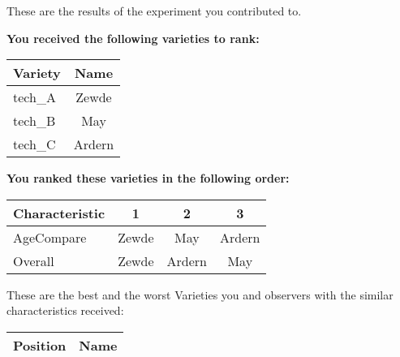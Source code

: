 \documentclass[10pt]{article}
\begin{document}
\begin{titlepage}
	These are the results of the experiment you contributed to.

	\begin{flushleft}
		\textbf{You received the following varieties to rank: }\hfill \break
		\begin{tabularx}{\textwidth}{ X | c  }
			\hline
			\textbf{Variety} & \textbf{Name} \\ \hline

			
				tech\_A & Zewde \\ \hline
			
				tech\_B & May \\ \hline
			
				tech\_C & Ardern \\ \hline
			


		\end{tabularx}\newline \newline

		\textbf{You ranked these varieties in the following order: }\hfill \break
		\begin{tabularx}{\textwidth}{ X | c | c | c  }
			\hline
			\textbf{Characteristic}
			
				& \textbf{ 1 }
			
				& \textbf{ 2 }
			
				& \textbf{ 3 }
			
			\\ \hline


			
				AgeCompare & Zewde  & May  & Ardern  \\ \hline


			
				Overall & Zewde  & Ardern  & May  \\ \hline


			

		\end{tabularx}

	\end{flushleft}

	\pagebreak

	\begin{flushleft}
		These are the best and the worst Varieties you and observers with the similar characteristics received:\hfill \break \newline
		\begin{tabularx}{\textwidth}{ X | X  }
			\hline
			\textbf{Position} & \textbf{Name} \\ \hline


\end{tabularx}
\end{flushleft}
\end{titlepage}
\end{document}
